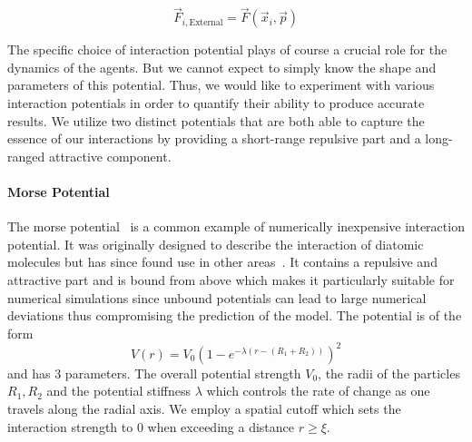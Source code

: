 \documentclass{article}
\begin{document}
\begin{equation}
    \vec{F}_{i,\text{External}} = \vec{F}(\vec{x}_i,\vec{p})
    \label{eq:cell-force-external}
\end{equation}

The specific choice of interaction potential plays of course a crucial role for the dynamics of the
agents.
But we cannot expect to simply know the shape and parameters of this potential.
Thus, we would like to experiment with various interaction potentials in order to quantify their
ability to produce accurate results.
We utilize two distinct potentials that are both able to capture the essence of our interactions by
providing a short-range repulsive part and a long-ranged attractive component.

\paragraph{Morse Potential}
The morse potential~\cite{Morse1929} is a common example of numerically inexpensive interaction
potential.
It was originally designed to describe the interaction of diatomic molecules but has since found use
in other areas~\cite{Breitwieser2021}.
It contains a repulsive and attractive part and is bound from above which makes it particularly
suitable for numerical simulations since unbound potentials can lead to large numerical deviations
thus compromising the prediction of the model.
The potential is of the form
\begin{equation}
    V(r) = V_0\left(1-e^{-\lambda(r-(R_1+R_2))}\right)^2
\end{equation}
and has 3 parameters.
The overall potential strength $V_0$, the radii of the particles $R_1,R_2$ and the potential
stiffness $\lambda$ which controls the rate of change as one travels along the radial axis.
We employ a spatial cutoff which sets the interaction strength to $0$ when exceeding a distance
$r\geq\xi$.
\end{document}
